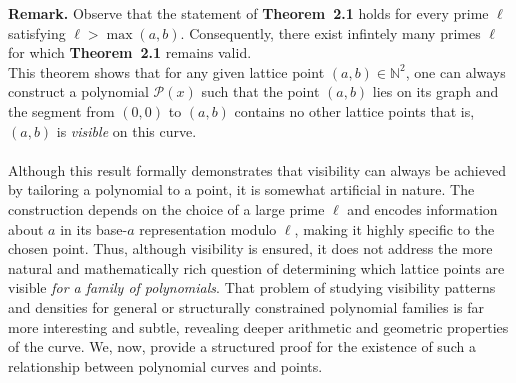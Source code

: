 \documentclass[12pt, reqno]{amsart}
\theoremstyle{definition}
\theoremstyle{remark}
\numberwithin{equation}{section}
\begin{document}
\noindent
\textbf{Remark.} Observe that the statement of \textbf{Theorem~2.1} holds for every prime $\ell$ satisfying $\ell > \max(a,b)$. Consequently, there exist infintely many primes $\ell$ for which \textbf{Theorem~2.1} remains valid.
\\

This theorem shows that for any given lattice point \((a,b) \in \mathbb{N}^2\), one can always construct a polynomial \(\mathcal{P}(x)\) such that the point \((a,b)\) lies on its graph and the segment from \((0,0)\) to \((a,b)\) contains no other lattice points that is, \((a,b)\) is \emph{visible} on this curve.\\\\
Although this result formally demonstrates that visibility can always be achieved by tailoring a polynomial to a point, it is somewhat artificial in nature. The construction depends on the choice of a large prime \(\ell\) and encodes information about \(a\) in its base-\(a\) representation modulo \(\ell\), making it highly specific to the chosen point. Thus, although visibility is ensured, it does not address the more natural and mathematically rich question of determining which lattice points are visible \emph{for a family of polynomials}. That problem of studying visibility patterns and densities for general or structurally constrained polynomial families is far more interesting and subtle, revealing deeper arithmetic and geometric properties of the curve. We, now, provide a structured proof for the existence of such a relationship between polynomial curves and points. \\
\end{document}
